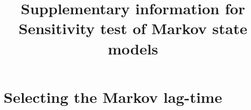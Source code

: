 \documentclass{article}
\title{Supplementary information for Sensitivity test of Markov state models}
\DeclareMathOperator*{\argmax}{arg\,max}
\begin{document}
\maketitle



\section{Selecting the Markov lag-time}
\end{document}
